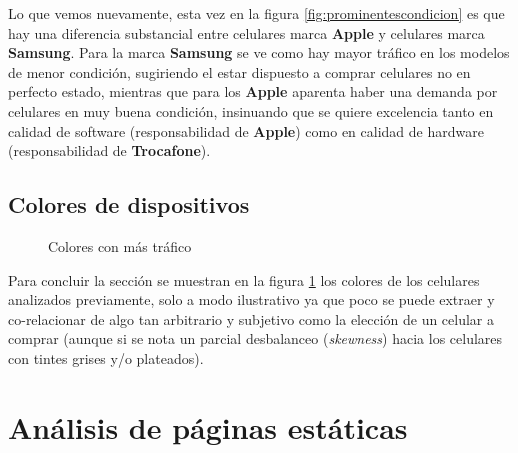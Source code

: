 \documentclass[a4paper]{article}
\begin{document}
Lo que vemos nuevamente, esta vez en la figura \ref{fig:prominentescondicion} es que hay una diferencia substancial entre celulares marca \textbf{Apple} y celulares marca \textbf{Samsung}. Para la marca \textbf{Samsung} se ve como hay mayor tráfico en los modelos de menor condición, sugiriendo el estar dispuesto a comprar celulares no en perfecto estado, mientras que para los \textbf{Apple} aparenta haber una demanda por celulares en muy buena condición, insinuando que se quiere excelencia tanto en calidad de software (responsabilidad de \textbf{Apple}) como en calidad de hardware (responsabilidad de \textbf{Trocafone}).

\subsection{Colores de dispositivos}

\begin{figure}[h!]
	\caption{Colores con más tráfico}
	\label{fig:colores}
\end{figure}

Para concluir la sección se muestran en la figura \ref{fig:colores} los colores de los celulares analizados previamente, solo a modo ilustrativo ya que poco se puede extraer y co-relacionar de algo tan arbitrario y subjetivo como la elección de un celular a comprar (aunque si se nota un parcial desbalanceo (\textit{skewness}) hacia los celulares con tintes grises y/o plateados).

\section{Análisis de páginas estáticas}
\end{document}
